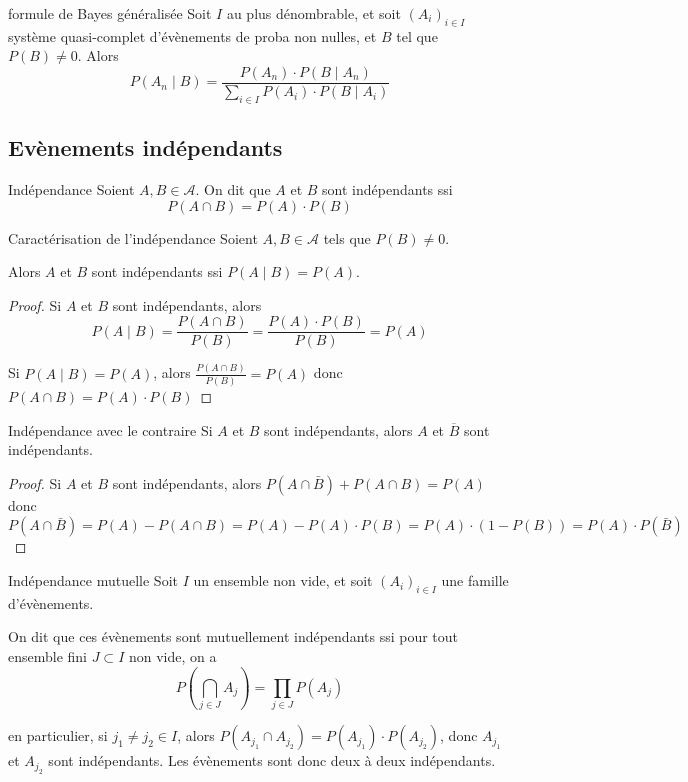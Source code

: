 \begin{corollaire}{formule de Bayes généralisée}{}
    Soit $I$ au plus dénombrable, et soit $(A_i)_{i \in I}$ système quasi-complet d'évènements 
    de proba non nulles, et $B$ tel que $P(B) \neq 0$. Alors 
    $$ P(A_n \mid B) = \frac{P(A_n) \cdot P(B \mid A_n)}{\sum_{i \in I} P(A_i) \cdot P(B \mid A_i)} $$
\end{corollaire}

\subsection{Evènements indépendants}
\begin{definition}{Indépendance}{}
    Soient $A, B \in \mathcal A$. On dit que $A$ et $B$ sont indépendants ssi 
    $$ P(A \cap B) = P(A) \cdot P(B) $$
\end{definition}

\begin{proposition}{Caractérisation de l'indépendance}{}
    Soient $A, B \in \mathcal A$ tels que $P(B) \neq 0$. 

    Alors $A$ et $B$ sont indépendants ssi $P(A \mid B) = P(A)$.
\end{proposition}

\begin{proof}
    Si $A$ et $B$ sont indépendants, alors 
    $$ P(A \mid B) = \frac{P(A \cap B)}{P(B)} = \frac{P(A) \cdot P(B)}{P(B)} = P(A) $$

    Si $P(A \mid B) = P(A)$, alors
    $ \frac{P(A \cap B)  }{P(B) } = P(A) $ donc $P(A \cap B) = P(A) \cdot P(B)$
\end{proof}

\begin{proposition}{Indépendance avec le contraire}{}
    Si $A$ et $B$ sont indépendants, alors $A$ et $\overline B$ sont indépendants. 
\end{proposition}


\begin{proof}
    Si $A$ et $B$ sont indépendants, alors 
    $P(A \cap \bar B) + P(A \cap B) = P(A)$
    donc $P(A \cap \bar B) = P(A) - P(A \cap B) = P(A) - P(A) \cdot P(B) = P(A) \cdot (1 - P(B)) = P(A) \cdot P(\bar B)$
\end{proof}

\begin{definition}{Indépendance mutuelle}{}
    Soit $I$ un ensemble non vide, et soit $(A_i)_{i \in I}$ une famille d'évènements.

    On dit que ces évènements sont mutuellement indépendants ssi pour tout
    ensemble fini $J \subset I$ non vide, on a 
    $$ P\left( \bigcap_{j \in J} A_j \right) = \prod_{j \in J} P(A_j) $$

    en particulier, si $j_1 \neq j_2 \in I$, alors 
    $P(A_{j_1} \cap A_{j_2}) = P(A_{j_1}) \cdot P(A_{j_2})$, donc 
    $A_{j_1}$ et $A_{j_2}$ sont indépendants. Les évènements sont donc deux à deux indépendants.
\end{definition}

